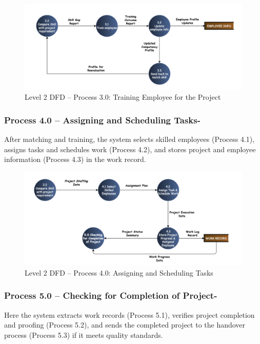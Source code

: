 \documentclass[12pt,a4paper]{article}
\begin{document}
\begin{figure}[H]
    \centering
    \includegraphics[width=\textwidth]{Fig/process3_dfd.png}
    \caption{Level 2 DFD – Process 3.0: Training Employee for the Project}
    \label{fig:level2_process3}
\end{figure}

\newpage
\subsubsection*{Process 4.0 – Assigning and Scheduling Tasks-}
\noindent
After matching and training, the system selects skilled employees (Process 4.1), assigns tasks and schedules work (Process 4.2), and stores project and employee information (Process 4.3) in the work record.

\begin{figure}[H]
    \centering
    \includegraphics[width=\textwidth]{Fig/process4_dfd.png}
    \caption{Level 2 DFD – Process 4.0: Assigning and Scheduling Tasks}
    \label{fig:level2_process4}
\end{figure}

\vspace{1.8cm}
\subsubsection*{Process 5.0 – Checking for Completion of Project-}
\noindent
Here the system extracts work records (Process 5.1), verifies project completion and proofing (Process 5.2), and sends the completed project to the handover process (Process 5.3) if it meets quality standards.
\end{document}
